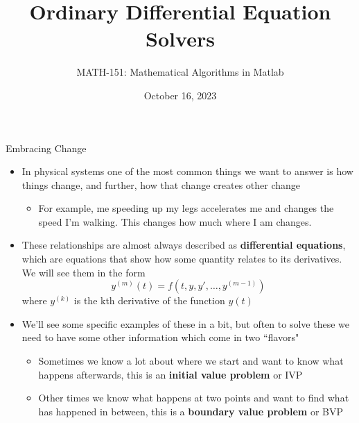 {}\documentclass[letterpaper,
compress,
xcolor=x11names,
]{beamer}
\begin{document}
	\title{Ordinary Differential Equation Solvers}
	\author{MATH-151:  Mathematical Algorithms in Matlab}
	\date[202X]{October 16, 2023}




\begin{frame}
\titlepage
\end{frame}


\begin{frame}{Embracing Change}
	\footnotesize
	\begin{itemize}
		\item In physical systems one of the most common things we want to answer is how things change, and further, how that change creates other change
		\begin{itemize}
			\item For example, me speeding up my legs accelerates me and changes the speed I'm walking. This changes how much where I am changes.
		\end{itemize}
		\item These relationships are almost always described as \textbf{differential equations}, which are equations that show how some quantity relates to its derivatives. We will see them in the form 
		\begin{equation*}
			y^{(m)}(t) = f(t,y,y',\dots,y^{(m-1)})
		\end{equation*}
		where $y^{(k)}$ is the kth derivative of the function $y(t)$
		\item We'll see some specific examples of these in a bit, but often to solve these we need to have some other information which come in two ``flavors"
		\begin{itemize}
			\item Sometimes we know a lot about where we start and want to know what happens afterwards, this is an \textbf{initial value problem} or IVP
			\item Other times we know what happens at two points and want to find what has happened in between, this is a \textbf{boundary value problem} or BVP
		\end{itemize}
	\end{itemize}
\end{frame}
\end{document}
